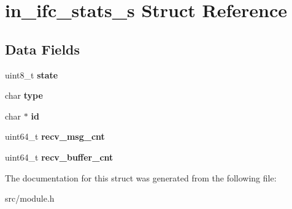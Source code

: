 \hypertarget{structin__ifc__stats__s}{}\section{in\+\_\+ifc\+\_\+stats\+\_\+s Struct Reference}
\label{structin__ifc__stats__s}
\subsection*{Data Fields}
\begin{DoxyCompactItemize}
\item 
\mbox{\label{structin__ifc__stats__s_ae96d6c466ddc4eb08abe7ce5f04dfc17}} 
uint8\+\_\+t {\bfseries state}
\item 
\mbox{\label{structin__ifc__stats__s_a88de50f124afd09ecfccdd343d35b91b}} 
char {\bfseries type}
\item 
\mbox{\label{structin__ifc__stats__s_a9d95708acaa529195fce7a2023704e77}} 
char $\ast$ {\bfseries id}
\item 
\mbox{\label{structin__ifc__stats__s_a6045c8c34a8643217e03b7ed77e2f38f}} 
uint64\+\_\+t {\bfseries recv\+\_\+msg\+\_\+cnt}
\item 
\mbox{\label{structin__ifc__stats__s_a3043c0006561e832683b9d9c7561d451}} 
uint64\+\_\+t {\bfseries recv\+\_\+buffer\+\_\+cnt}
\end{DoxyCompactItemize}


The documentation for this struct was generated from the following file\+:\begin{DoxyCompactItemize}
\item 
src/module.\+h\end{DoxyCompactItemize}
